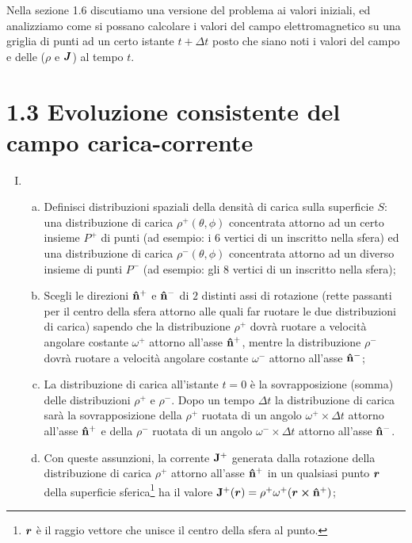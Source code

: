 Nella sezione 1.6 discutiamo una versione  del problema ai valori iniziali, ed analizziamo come si possano calcolare i valori del campo elettromagnetico su una griglia di punti ad un certo istante $t+\Delta t$ posto che siano noti i valori del campo e delle  ($\rho$ e $\vb*{J}$) al tempo $t$. 

\section*{1.3 Evoluzione consistente del campo carica-corrente}\label{sec_1.3}
\begin{enumerate}[(I)]
\item {} 
	\begin{enumerate}[(a)]
	\item Definisci  distribuzioni spaziali della densità di carica sulla superficie $S$: una distribuzione di carica  $\rho^+(\theta, \phi)$ concentrata attorno ad un certo insieme $P^+$ di punti (ad esempio: i $6$ vertici di un   inscritto nella sfera) ed una distribuzione di carica  $\rho^-(\theta, \phi)$ concentrata attorno ad un diverso insieme di punti $P^-$ (ad esempio: gli $8$ vertici di un   inscritto nella sfera);
	\item Scegli le direzioni $\vu{n}^+$ e $\vu{n}^-$ di $2$ distinti assi di rotazione (rette passanti per il centro della sfera attorno alle quali far ruotare le due distribuzioni di carica) sapendo che la distribuzione $\rho^+$ dovrà ruotare a velocità angolare costante $\omega^+$  attorno all'asse $\vu{n}^+$, mentre la distribuzione $\rho^-$ dovrà ruotare a velocità angolare costante $\omega^-$  attorno all'asse $\vu{n}^-$; 
	\item La distribuzione di carica all'istante $t = 0$ è la sovrapposizione (somma) delle distribuzioni $\rho^+$ e $\rho^-$. Dopo un tempo $\Delta t$ la distribuzione di carica sarà la sovrapposizione della $\rho^+$ ruotata di un angolo $\omega^+ \times \Delta t$ attorno all'asse $\vu{n}^+$ e della $\rho^-$ ruotata di un angolo $\omega^- \times \Delta t$ attorno all'asse $\vu{n}^-$. 
	\item Con queste assunzioni, la corrente  $\vb{J}^+$ generata dalla rotazione della distribuzione di carica $\rho^+$ attorno all'asse $\vu{n}^+$ in un qualsiasi punto $\vb*{r}$ della superficie sferica\footnote{$\vb*{r}$ è il raggio vettore che unisce il centro della sfera al punto.} ha il valore $\vb{J}^+(\vb*{r}) = \rho^+ \omega^+ (\vb*{r} \cross \vu{n}^+)$;

\end{enumerate}
\end{enumerate}
